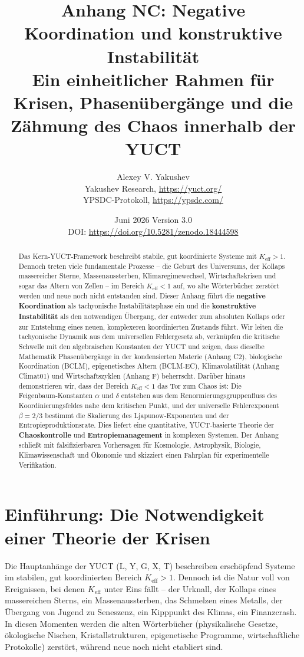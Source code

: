\documentclass[12pt,a4paper]{article}
\title{\Huge\textbf{Anhang NC: Negative Koordination und konstruktive Instabilität}\\[0.3cm]
	\large Ein einheitlicher Rahmen für Krisen, Phasenübergänge und die Zähmung des Chaos innerhalb der YUCT}
\author{Alexey V. Yakushev \\ 
	Yakushev Research, \url{https://yuct.org/} \\ 
	YPSDC-Protokoll, \url{https://ypsdc.com/}}
\date{Juni 2026 \quad Version 3.0 \\ \medskip
	DOI: \url{https://doi.org/10.5281/zenodo.18444598}}
\newcommand{\Keff}{K_{\mathrm{eff}}}
\begin{document}
	
	\maketitle
	
	\begin{abstract}
		Das Kern‑YUCT‑Framework beschreibt stabile, gut koordinierte Systeme mit $\Keff > 1$.
		Dennoch treten viele fundamentale Prozesse – die Geburt des Universums, der Kollaps massereicher Sterne,
		Massenaussterben, Klimaregimewechsel, Wirtschaftskrisen und sogar das Altern von Zellen –
		im Bereich $\Keff < 1$ auf, wo alte Wörterbücher zerstört werden und neue noch nicht entstanden sind.
		Dieser Anhang führt die \textbf{negative Koordination} als tachyonische Instabilitätsphase ein
		und die \textbf{konstruktive Instabilität} als den notwendigen Übergang, der entweder zum absoluten
		Kollaps oder zur Entstehung eines neuen, komplexeren koordinierten Zustands führt.
		Wir leiten die tachyonische Dynamik aus dem universellen Fehlergesetz ab, verknüpfen die kritische
		Schwelle mit den algebraischen Konstanten der YUCT und zeigen, dass dieselbe Mathematik
		Phasenübergänge in der kondensierten Materie (Anhang C2), biologische Koordination (BCLM),
		epigenetisches Altern (BCLM‑EC), Klimavolatilität (Anhang Climat01) und Wirtschaftszyklen (Anhang F)
		beherrscht. Darüber hinaus demonstrieren wir, dass der Bereich $\Keff < 1$ das Tor zum Chaos ist:
		Die Feigenbaum‑Konstanten $\alpha$ und $\delta$ entstehen aus dem Renormierungsgruppenfluss des
		Koordinierungsfeldes nahe dem kritischen Punkt, und der universelle Fehlerexponent $\beta = 2/3$
		bestimmt die Skalierung des Ljapunow‑Exponenten und der Entropieproduktionsrate.
		Dies liefert eine quantitative, YUCT‑basierte Theorie der \textbf{Chaoskontrolle} und
		\textbf{Entropiemanagement} in komplexen Systemen. Der Anhang schließt mit falsifizierbaren
		Vorhersagen für Kosmologie, Astrophysik, Biologie, Klimawissenschaft und Ökonomie und skizziert
		einen Fahrplan für experimentelle Verifikation.
	\end{abstract}
	
	\tableofcontents
	\newpage
	
	\section{Einführung: Die Notwendigkeit einer Theorie der Krisen}
	
	Die Hauptanhänge der YUCT (L, Y, G, X, T) beschreiben erschöpfend Systeme im stabilen,
	gut koordinierten Bereich $\Keff > 1$. Dennoch ist die Natur voll von Ereignissen, bei denen
	$\Keff$ unter Eins fällt – der Urknall, der Kollaps eines massereichen Sterns, ein Massenaussterben,
	das Schmelzen eines Metalls, der Übergang von Jugend zu Seneszenz, ein Kipppunkt des Klimas,
	ein Finanzcrash. In diesen Momenten werden die alten Wörterbücher (physikalische Gesetze,
	ökologische Nischen, Kristallstrukturen, epigenetische Programme, wirtschaftliche Protokolle)
	zerstört, während neue noch nicht etabliert sind.
	
\end{document}
